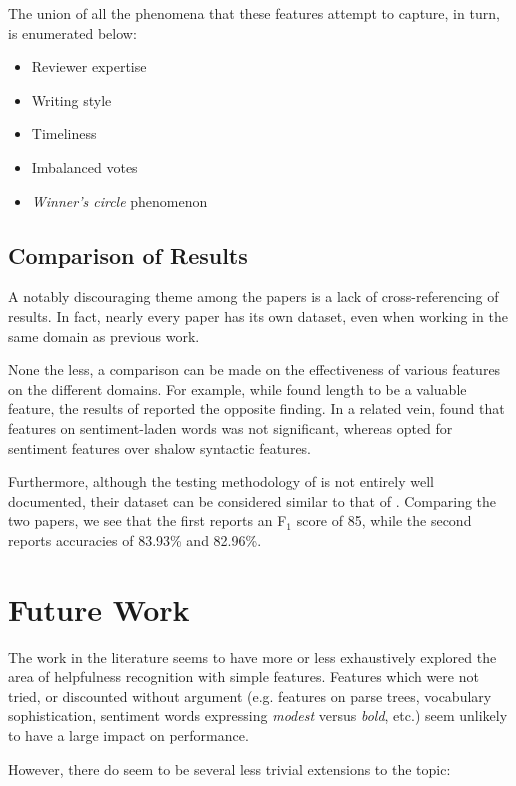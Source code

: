 \documentclass[12pt,letterpaper]{article}
\begin{document}
The union of all the phenomena that these features attempt to capture, in turn, is enumerated below:
\begin{itemize}
	\item Reviewer expertise
	\item Writing style
	\item Timeliness
	\item Imbalanced votes
	\item {\em Winner's circle} phenomenon
\end{itemize}

\subsection{Comparison of Results}
A notably discouraging theme among the papers is a lack of cross-referencing of results.
In fact, nearly every paper has its own dataset, even when working in the same domain
	as previous work.

None the less, a comparison can be made on the effectiveness of various features
	on the different domains.
For example, while  found length to be a valuable feature, the
	results of  reported the opposite finding.
In a related vein,  found that features on sentiment-laden
	words was not significant, whereas  opted for sentiment
	features over shalow syntactic features.

Furthermore, although the testing methodology of  is not entirely
	well documented, their dataset can be considered similar to that of .
Comparing the two papers, we see that the first reports an F$_1$ score of 85, while the second reports
	accuracies of 83.93\% and 82.96\%.



\section{Future Work}
The work in the literature seems to have more or less exhaustively explored the area of helpfulness recognition
	with simple features.
Features which were not tried, or discounted without argument (e.g. features on parse trees, 
	vocabulary sophistication, sentiment words expressing {\em modest} versus {\em bold}, etc.) seem unlikely
	to have a large impact on performance.

However, there do seem to be several less trivial extensions to the topic:
\end{document}
